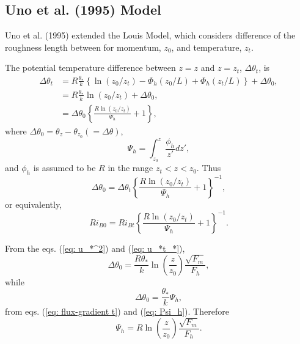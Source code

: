 \subsection{Uno et al. (1995) Model}
Uno et al. (1995) extended the Louis Model,
which considers difference of the roughness length
between for momentum, $z_0$, and temperature, $z_t$.

The potential temperature difference between $z=z$ and $z=z_t$,
$\Delta\theta_t$, is
\begin{align}
  \Delta\theta_t
  &= R\frac{\theta_*}{k}\left\{\ln(z_0/z_t) - \Phi_h(z_0/L) + \Phi_h(z_t/L)\right\} + \Delta\theta_0, \nonumber \\
  &= R\frac{\theta_*}{k}{\ln(z_0/z_t)} + \Delta\theta_0, \nonumber \\
  &= \Delta\theta_0 \left\{\frac{R\ln(z_0/z_t)}{\Psi_h} + 1\right\},
\end{align}
where $\Delta\theta_0 = \theta_z - \theta_{z_0} (=\Delta\theta)$,
\begin{equation}
  \Psi_h = \int_{z_0}^z\frac{\phi_h}{z'}dz', \label{eq: Psi_h}
\end{equation}
and $\phi_h$ is assumed to be $R$ in the range $z_t < z < z_0$.
Thus
\begin{equation}
  \Delta\theta_0 = \Delta\theta_t \left\{\frac{R\ln(z_0/z_t)}{\Psi_h}+1\right\}^{-1},
  \label{eq: Delta t_0}
\end{equation}
or equivalently,
\begin{equation}
  Ri_{B0} = Ri_{Bt} \left\{\frac{R\ln(z_0/z_t)}{\Psi_h}+1\right\}^{-1}.
  \label{eq: Ri_B0}
\end{equation}

From the eqs. (\ref{eq: u_*^2}) and (\ref{eq: u_*t_*}),
\begin{equation}
  \Delta\theta_0 = \frac{R\theta_*}{k}\ln\left(\frac{z}{z_0}\right)\frac{\sqrt{F_m}}{F_h},
\end{equation}
while
\begin{equation}
  \Delta\theta_0 = \frac{\theta_*}{k}\Psi_h,
\end{equation}
from eqs. (\ref{eq: flux-gradient t}) and (\ref{eq: Psi_h}).
Therefore
\begin{equation}
  \Psi_h = R\ln\left(\frac{z}{z_0}\right)\frac{\sqrt{F_m}}{F_h}.
  \label{eq: Psi}
\end{equation}


